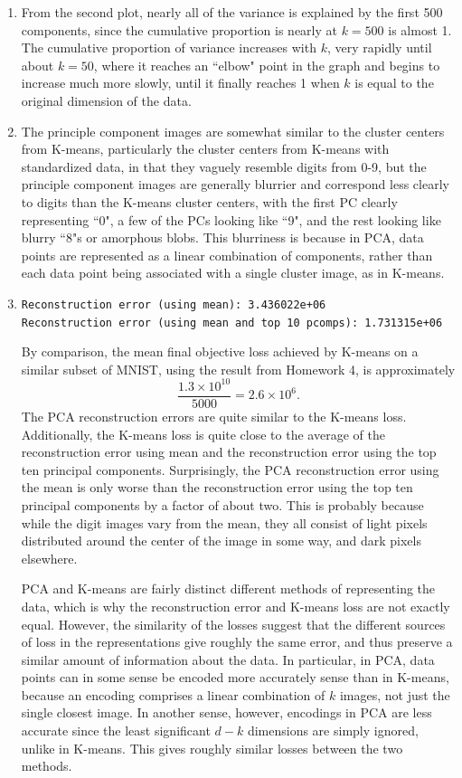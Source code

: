 \documentclass[submit]{harvardml}
\begin{document}
\begin{enumerate}
  \item From the second plot, nearly all of the variance is explained by the first 500 components, since the cumulative proportion is nearly at $k=500$ is almost 1. The cumulative proportion of variance increases with $k$, very rapidly until about $k=50$, where it reaches an ``elbow" point in the graph and begins to increase much more slowly, until it finally reaches 1 when $k$ is equal to the original dimension of the data.

  \item The principle component images are somewhat similar to the cluster centers from K-means, particularly the cluster centers from K-means with standardized data, in that they vaguely resemble digits from 0-9, but the principle component images are generally blurrier and correspond less clearly to digits than the K-means cluster centers, with the first PC clearly representing ``0", a few of the PCs looking like ``9", and the rest looking like blurry ``8"s or amorphous blobs. This blurriness is because in PCA, data points are represented as a linear combination of components, rather than each data point being associated with a single cluster image, as in K-means.

  \item
  \texttt{Reconstruction error (using mean): 3.436022e+06 \\
  			 Reconstruction error (using mean and top 10 pcomps): 1.731315e+06}
  
  By comparison, the mean final objective loss achieved by K-means on a similar subset of MNIST, using the result from Homework 4, is approximately
  $$\frac{1.3 \times 10^{10}}{5000} = 2.6 \times 10^{6}.$$
  The PCA reconstruction errors are quite similar to the K-means loss. Additionally, the K-means loss is quite close to the average of the reconstruction error using mean and the reconstruction error using the top ten principal components. Surprisingly, the PCA reconstruction error using the mean is only worse than the reconstruction error using the top ten principal components by a factor of about two. This is probably because while the digit images vary from the mean, they all consist of light pixels distributed around the center of the image in some way, and dark pixels elsewhere.

  PCA and K-means are fairly distinct different methods of representing the data, which is why the reconstruction error and K-means loss are not exactly equal. However, the similarity of the losses suggest that the different sources of loss in the representations give roughly the same error, and thus preserve a similar amount of information about the data. In particular, in PCA, data points can in some sense be encoded more accurately sense than in K-means, because an encoding comprises a linear combination of $k$ images, not just the single closest image. In another sense, however, encodings in PCA are less accurate since the least significant $d-k$ dimensions are simply ignored, unlike in K-means. This gives roughly similar losses between the two methods.



\end{enumerate}
\end{document}

